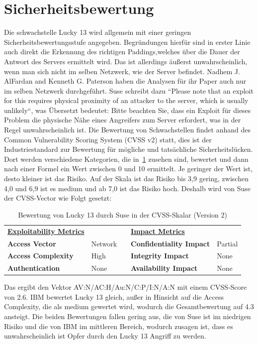 \documentclass[a4paper,10pt]{scrartcl}
\begin{document}
    \section{Sicherheitsbewertung}\label{sec:sicherheitsbewertung}
    Die schwachstelle Lucky 13 wird allgemein mit einer geringen Sicherheitsbewertungsstufe angegeben.
    Begründungen hierfür sind in erster Linie auch direkt die Erkennung des richtigen Paddings,welches über die Dauer der Antwort des Servers ermittelt wird.
    Das ist allerdings äußerst unwahrscheinlich, wenn man sich nicht im selben Netzwerk, wie der Server befindet.
    Nadhem J. AlFardan and Kenneth G. Paterson haben die Analysen für ihr Paper auch nur im selben Netzwerk durchgeführt.
    Suse schreibt dazu ``Please note that an exploit for this requires physical proximity of an attacker to the server, which is usually unlikely``, was Übersetzt bedeutet: Bitte beachten Sie, dass ein Exploit für dieses Problem die physische Nähe eines Angreifers zum Server erfordert, was in der Regel unwahrscheinlich ist.
    \newline
    Die Bewertung von Schwachstellen findet anhand des Common Vulnerability Scoring System (CVSS v2) statt, dies ist der Industriestandard zur Bewertung für mögliche und tatsächliche Sicherheitslücken.
    Dort werden verschiedene Kategorien, die in~\ref{tab:CVSS-Vektor} zusehen sind, bewertet und dann nach einer Formel ein Wert zwischen 0 und 10 ermittelt.
    Je geringer der Wert ist, desto kleiner ist das Risiko.
    Auf der Skala ist das Risiko bis 3,9 gering, zwischen 4,0 und 6,9 ist es medium und ab 7,0 ist das Risiko hoch.
    Deshalb wird von Suse der CVSS-Vector wie Folgt gesetzt:
    \begin{table}[h]
        \begin{tabular}{lllll}
        {\ul \textbf{Exploitability Metrics}}
            &         & & {\ul \textbf{Impact Metrics}}   & \multicolumn{1}{c}{} \\
            \textbf{Access Vector}     & Network & & \textbf{Confidentiality Impact} & Partial              \\
            \textbf{Access Complexity} & High    & & \textbf{Integrity Impact}       & None                 \\
            \textbf{Authentication}    & None    & & \textbf{Availability Impact}    & None
        \end{tabular}\caption{Bewertung von Lucky 13 durch Suse in der CVSS-Skalar (Version 2)}\label{tab:CVSS-Vektor}
    \end{table}
    \newline
    Das ergibt den Vektor AV:N/AC:H/Au:N/C:P/I:N/A:N mit einem CVSS-Score von 2.6.
    IBM bewertet Lucky 13 gleich, außer in Hinsicht auf die Access Complexity, die als medium gewertet wird, wodurch die Gesamtbewertung auf 4.3 ansteigt.
    Die beiden Bewertungen fallen gering aus, die von Suse ist im niedrigen Risiko und die von IBM im mittleren Bereich, wodurch zusagen ist, dass es unwahrscheinlich ist Opfer durch den Lucky 13 Angriff zu werden.
\end{document}
